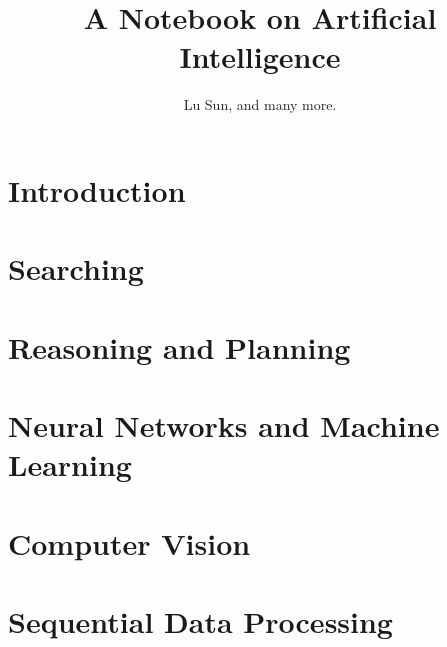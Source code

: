 



\makeindex



\frontmatter

\title{A Notebook on Artificial Intelligence}
\author{Lu Sun, and many more.}

\maketitle


\tableofcontents


\listoffigures
\listoftables

\mainmatter

\part{Introduction}

\part{Searching}

\part{Reasoning and Planning}

\part{Neural Networks and Machine Learning}







\part{Computer Vision}



\part{Sequential Data Processing}










\printindex


